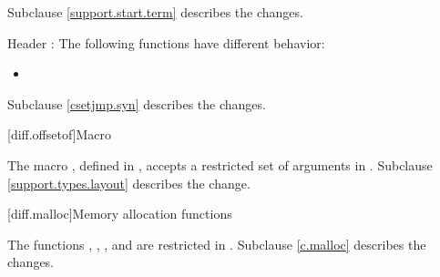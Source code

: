 Subclause \ref{support.start.term} describes the changes.

\pnum
Header :
The following functions have different behavior:
\begin{itemize}
\item {}
\end{itemize}

Subclause \ref{csetjmp.syn} describes the changes.

[diff.offsetof]{Macro }
%

\pnum
The macro , defined in
,
accepts a restricted set of  arguments in \Cpp{}.
Subclause \ref{support.types.layout} describes the change.

[diff.malloc]{Memory allocation functions}

\pnum
The functions
,
,
,
and
are restricted in \Cpp{}.
Subclause \ref{c.malloc} describes the changes.
